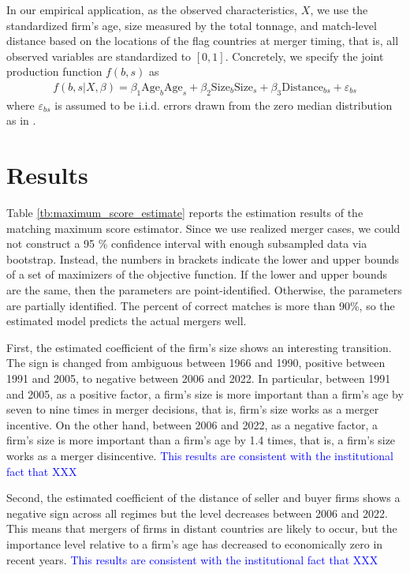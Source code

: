 \documentclass[10pt]{article}
\begin{document}
In our empirical application, as the observed characteristics, $X$, we use the standardized firm's age, size measured by the total tonnage, and match-level distance based on the locations of the flag countries at merger timing, that is, all observed variables are standardized to $[0,1]$. 
Concretely, we specify the joint production function $f(b,s)$ as
\begin{align*}
    f(b,s|X,\beta)= \beta_1 \text{Age}_{b}\text{Age}_{s} + \beta_2 \text{Size}_{b}\text{Size}_{s} + \beta_3 \text{Distance}_{bs} + \varepsilon_{bs}
\end{align*}
where $\varepsilon_{bs}$ is assumed to be i.i.d. errors drawn from the zero median distribution as in \cite{fox2018qe}. 


\section{Results}\label{sec:results}

Table \ref{tb:maximum_score_estimate} reports the estimation results of the matching maximum score estimator. 
Since we use realized merger cases, we could not construct a 95 \% confidence interval with enough subsampled data via bootstrap.
Instead, the numbers in brackets indicate the lower and upper bounds of a set of maximizers of the objective function. 
If the lower and upper bounds are the same, then the parameters are point-identified. Otherwise, the parameters are partially identified.
The percent of correct matches is more than 90\%, so the estimated model predicts the actual mergers well.


First, the estimated coefficient of the firm's size shows an interesting transition. 
The sign is changed from ambiguous between 1966 and 1990, positive between 1991 and 2005, to negative between 2006 and 2022. 
In particular, between 1991 and 2005, as a positive factor, a firm's size is more important than a firm's age by seven to nine times in merger decisions, that is, firm's size works as a merger incentive.
On the other hand, between 2006 and 2022, as a negative factor, a firm's size is more important than a firm's age by 1.4 times, that is, a firm's size works as a merger disincentive.
\textcolor{blue}{This results are consistent with the institutional fact that XXX}

Second, the estimated coefficient of the distance of seller and buyer firms shows a negative sign across all regimes but the level decreases between 2006 and 2022. 
This means that mergers of firms in distant countries are likely to occur, but the importance level relative to a firm's age has decreased to economically zero in recent years.
\textcolor{blue}{This results are consistent with the institutional fact that XXX}
\end{document}
